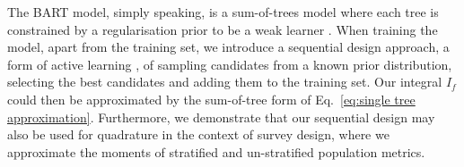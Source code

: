 The BART model, simply speaking, is a sum-of-trees model where each tree is constrained by a regularisation prior to be a weak learner \cite{BART}. When training the model, apart from the training set, we introduce a sequential design approach, a form of active learning \cite{doi:10.1002/cjs.11156}, of sampling candidates from a known prior distribution, selecting the best candidates and adding them to the training set. Our integral $I_f$ could then be approximated by the sum-of-tree form of Eq.~\eqref{eq:single tree approximation}. Furthermore, we demonstrate that our sequential design may also be used for quadrature in the context of survey design, where we approximate the moments of stratified and un-stratified population metrics.